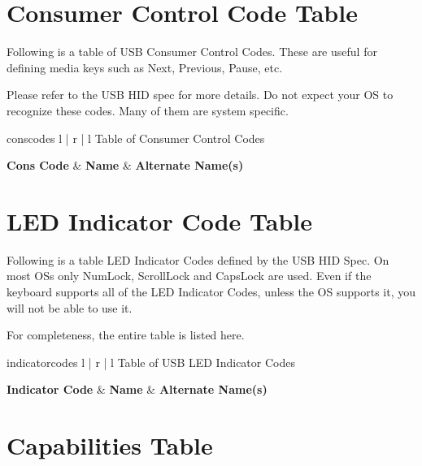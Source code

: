 \documentclass{kiibohd-template}
\begin{document}
\newpage
\chapter{Consumer Control Code Table}
\label{chpt:ConsCodeTable}

Following is a table of USB Consumer Control Codes.
These are useful for defining media keys such as Next, Previous, Pause, etc.

Please refer to the USB HID spec for more details.
Do not expect your OS to recognize these codes.
Many of them are system specific.

\begin{ltable}{conscodes}{ l | r | l }{Table of Consumer Control Codes}

\textbf{Cons Code} & \textbf{Name} & \textbf{Alternate Name(s)} \\
\hline
\hline


\end{ltable}


\newpage
\chapter{LED Indicator Code Table}
\label{chpt:LEDIndicatorCodeTable}
Following is a table LED Indicator Codes defined by the USB HID Spec.
On most OSs only NumLock, ScrollLock and CapsLock are used.
Even if the keyboard supports all of the LED Indicator Codes, unless the OS supports it, you will not be able to use it.

For completeness, the entire table is listed here.

\begin{ltable}{indicatorcodes}{ l | r | l }{Table of USB LED Indicator Codes}

\textbf{Indicator Code} & \textbf{Name} & \textbf{Alternate Name(s)} \\
\hline
\hline


\end{ltable}


\newpage
\chapter{Capabilities Table}
\label{chpt:CapabilitiesTable}
\end{document}
